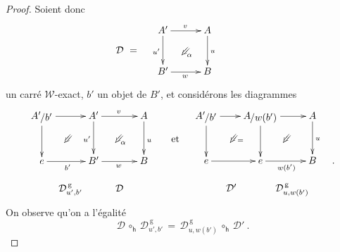 \documentclass[francais]{smfart}
\theoremstyle{plain}
\theoremstyle{remark}
\theoremstyle{definition}
\numberwithin{equation}{thm}
\begin{document}
\begin{proof}
Soient donc  
\[
\mathcal{D}\ =\quad
\raise 23pt
\vbox{
\UseTwocells
\xymatrixcolsep{2.5pc}
\xymatrixrowsep{2.4pc}
\xymatrix{
A'\ar[d]_{u'}\ar[r]^{v}
\drtwocell<\omit>{\alpha}
&A\ar[d]^{u}
\\
B'\ar[r]_{w}
&B
&\hskip -30pt
}
}
\]
un carré ${\mathcal{W}}$-exact, $b'$ un objet de $B'$, et considérons les diagrammes
\[
\xymatrixrowsep{1.pc}
\xymatrixcolsep{.4pc}
\UseAllTwocells
\xymatrix{
{\mathchoice {{A'}\raise -1.8pt\vbox{\hbox{$\kern -.8pt/{b'}$}}} {{A'}\raise -1.8pt\vbox{\hbox{$\kern -.8pt/{b'}$}}\kern .8pt} {{A'}\raise -1.8pt\vbox{\hbox{$\scriptstyle\kern -.8pt /{b'}$}}} {{A'}\raise -1.8pt\vbox{\hbox{$\scriptscriptstyle\kern -.8pt /{b'}$}}} }\ddrrcompositemap<\omit>{}
  \ar[rr]^{}
  \ar[dd]_{}
&&A'\ddrrcompositemap<\omit>{\alpha}
  \ar[rr]^{v}
  \ar[dd]_{u'}
&&A\ar[dd]^{u\hskip 20pt\hbox{et}}
\\
\\
e\ar[rr]_{b'}
&&B'\ar[rr]_w
&&B
\\
&\hskip -5pt\mathcal D^{\mathrm{\,g}}_{u',b'}\hskip -5pt
&&\hskip 6pt\mathcal D\hskip 6pt
}
\hskip 10pt
\xymatrix{
{\mathchoice {{A'}\raise -1.8pt\vbox{\hbox{$\kern -.8pt/{b'}$}}} {{A'}\raise -1.8pt\vbox{\hbox{$\kern -.8pt/{b'}$}}\kern .8pt} {{A'}\raise -1.8pt\vbox{\hbox{$\scriptstyle\kern -.8pt /{b'}$}}} {{A'}\raise -1.8pt\vbox{\hbox{$\scriptscriptstyle\kern -.8pt /{b'}$}}} }\ddrrcompositemap<\omit>{}
  \ar[rr]^{}
  \ar[dd]_{}
&&{\mathchoice {{A}\raise -1.8pt\vbox{\hbox{$\kern -.8pt/{w(b')}$}}} {{A}\raise -1.8pt\vbox{\hbox{$\kern -.8pt/{w(b')}$}}\kern .8pt} {{A}\raise -1.8pt\vbox{\hbox{$\scriptstyle\kern -.8pt /{w(b')}$}}} {{A}\raise -1.8pt\vbox{\hbox{$\scriptscriptstyle\kern -.8pt /{w(b')}$}}} }\ddrrcompositemap<\omit>{}
  \ar[rr]^{}
  \ar[dd]_{}\ar@<-3.3ex>@{}[dd]_(.55){=}
&&A\ar[dd]^{u}
\\
\\
e\ar[rr]_{}
&&e\ar[rr]_{w(b')}
&&B
&\hskip 5pt.
\\
&\hskip -2pt\mathcal D'\hskip -4pt
&&\hskip -13pt\mathcal D^{\mathrm{\,g}}_{u,w(b')}\hskip -11pt
}
\]
On observe qu'on a l'égalité
\[
\mathcal D\,{\circ^{}_{\mathsf h}}\,\mathcal D^{\mathrm{\,g}}_{u',b'}\,=\,\mathcal D^{\mathrm{\,g}}_{u,w(b')}\,{\circ^{}_{\mathsf h}}\,\mathcal D'{\ }.
\]

\end{proof}
\end{document}
